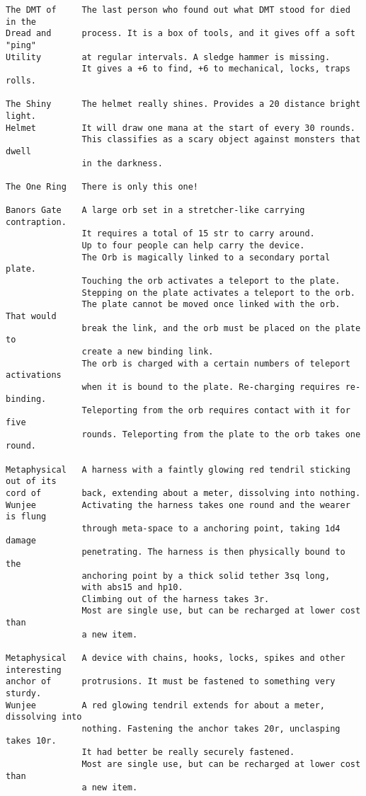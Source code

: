 \begin{verbatim}
The DMT of     The last person who found out what DMT stood for died in the
Dread and      process. It is a box of tools, and it gives off a soft "ping"
Utility        at regular intervals. A sledge hammer is missing.
               It gives a +6 to find, +6 to mechanical, locks, traps rolls.

The Shiny      The helmet really shines. Provides a 20 distance bright light.
Helmet         It will draw one mana at the start of every 30 rounds.
               This classifies as a scary object against monsters that dwell
               in the darkness.

The One Ring   There is only this one!

Banors Gate    A large orb set in a stretcher-like carrying contraption.
               It requires a total of 15 str to carry around.
               Up to four people can help carry the device.
               The Orb is magically linked to a secondary portal plate.
               Touching the orb activates a teleport to the plate.
               Stepping on the plate activates a teleport to the orb.
               The plate cannot be moved once linked with the orb. That would
               break the link, and the orb must be placed on the plate to
               create a new binding link.
               The orb is charged with a certain numbers of teleport activations
               when it is bound to the plate. Re-charging requires re-binding.
               Teleporting from the orb requires contact with it for five
               rounds. Teleporting from the plate to the orb takes one round.

Metaphysical   A harness with a faintly glowing red tendril sticking out of its
cord of        back, extending about a meter, dissolving into nothing.
Wunjee         Activating the harness takes one round and the wearer is flung
               through meta-space to a anchoring point, taking 1d4 damage
               penetrating. The harness is then physically bound to the
               anchoring point by a thick solid tether 3sq long,
               with abs15 and hp10.
               Climbing out of the harness takes 3r.
               Most are single use, but can be recharged at lower cost than
               a new item.

Metaphysical   A device with chains, hooks, locks, spikes and other interesting
anchor of      protrusions. It must be fastened to something very sturdy.
Wunjee         A red glowing tendril extends for about a meter, dissolving into
               nothing. Fastening the anchor takes 20r, unclasping takes 10r.
               It had better be really securely fastened.
               Most are single use, but can be recharged at lower cost than
               a new item.


\end{verbatim}
